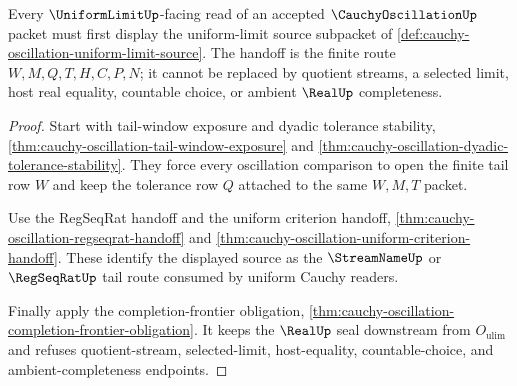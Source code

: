 \begin{theorem}
\label{thm:cauchy-oscillation-uniform-limit-tail-handoff}
Every $\UniformLimitUp$-facing read of an accepted $\CauchyOscillationUp$ packet must first display the uniform-limit source subpacket of \autoref{def:cauchy-oscillation-uniform-limit-source}. The handoff is the finite route $W,M,Q,T,H,C,P,N$; it cannot be replaced by quotient streams, a selected limit, host real equality, countable choice, or ambient $\RealUp$ completeness.
\end{theorem}
\begin{proof}
Start with tail-window exposure and dyadic tolerance stability, \autoref{thm:cauchy-oscillation-tail-window-exposure} and \autoref{thm:cauchy-oscillation-dyadic-tolerance-stability}. They force every oscillation comparison to open the finite tail row $W$ and keep the tolerance row $Q$ attached to the same $W,M,T$ packet.

Use the RegSeqRat handoff and the uniform criterion handoff, \autoref{thm:cauchy-oscillation-regseqrat-handoff} and \autoref{thm:cauchy-oscillation-uniform-criterion-handoff}. These identify the displayed source as the $\StreamNameUp$ or $\RegSeqRatUp$ tail route consumed by uniform Cauchy readers.

Finally apply the completion-frontier obligation, \autoref{thm:cauchy-oscillation-completion-frontier-obligation}. It keeps the $\RealUp$ seal downstream from $O_{\mathrm{ulim}}$ and refuses quotient-stream, selected-limit, host-equality, countable-choice, and ambient-completeness endpoints.
\end{proof}

